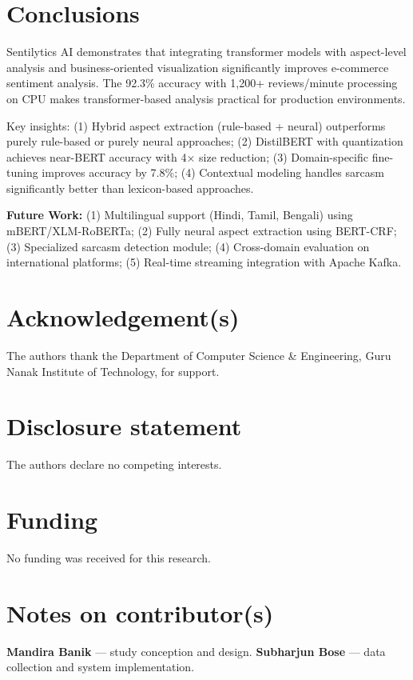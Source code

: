 \documentclass[]{interact}
\theoremstyle{plain}
\theoremstyle{definition}
\theoremstyle{remark}
\begin{document}
\section{Conclusions}

Sentilytics AI demonstrates that integrating transformer models with aspect-level analysis and business-oriented visualization significantly improves e-commerce sentiment analysis. The 92.3\% accuracy with 1,200+ reviews/minute processing on CPU makes transformer-based analysis practical for production environments.

Key insights: (1) Hybrid aspect extraction (rule-based + neural) outperforms purely rule-based or purely neural approaches; (2) DistilBERT with quantization achieves near-BERT accuracy with 4× size reduction; (3) Domain-specific fine-tuning improves accuracy by 7.8\%; (4) Contextual modeling handles sarcasm significantly better than lexicon-based approaches.

\textbf{Future Work:} (1) Multilingual support (Hindi, Tamil, Bengali) using mBERT/XLM-RoBERTa; (2) Fully neural aspect extraction using BERT-CRF; (3) Specialized sarcasm detection module; (4) Cross-domain evaluation on international platforms; (5) Real-time streaming integration with Apache Kafka.


\section*{Acknowledgement(s)}

The authors thank the Department of Computer Science \& Engineering, Guru Nanak Institute of Technology, for support.


\section*{Disclosure statement}

The authors declare no competing interests.


\section*{Funding}

No funding was received for this research.


\section*{Notes on contributor(s)}

\textbf{Mandira Banik} — study conception and design. \textbf{Subharjun Bose} — data collection and system implementation.
\end{document}
